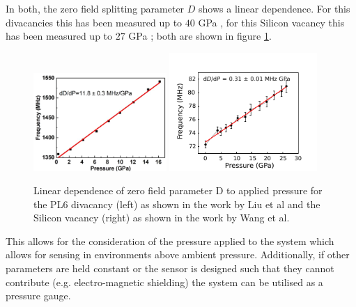 In both, the zero field splitting parameter $D$ shows
a linear dependence. For this divacancies this has been measured up to $40$ GPa \cite{doi:10.1021/acs.nanolett.2c03378}, for this Silicon vacancy this has been measured up to $27$ GPa \cite{Wang2023}; both are shown in figure \ref{fig:pressure_d}.

\begin{figure}[H]
	\begin{center}
		\includegraphics[width=0.45\textwidth]{figures/PressureDependence.png}
		\includegraphics[width=0.50\textwidth]{figures/PressureDependenceVSi.pdf}
	\end{center}
	\caption{Linear dependence of zero field parameter D to applied pressure for the PL6 divacancy (left) as shown in the work by Liu et al and the Silicon vacancy (right) as shown in the work by Wang et al.}\label{fig:pressure_d}
\end{figure}

This allows for the consideration of the pressure applied to the system which allows for sensing in environments above ambient pressure. Additionally, if other parameters are held constant or the sensor is designed such that they cannot contribute (e.g. electro-magnetic shielding) the system can be utilised as a pressure gauge.


